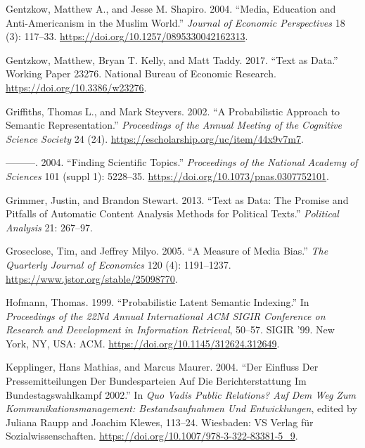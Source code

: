 \documentclass[
]{article}
\begin{document}
\leavevmode\hypertarget{ref-gentzkow_media_2004}{}%
Gentzkow, Matthew A., and Jesse M. Shapiro. 2004. ``Media, Education and
Anti-Americanism in the Muslim World.'' \emph{Journal of Economic
Perspectives} 18 (3): 117--33.
\url{https://doi.org/10.1257/0895330042162313}.

\leavevmode\hypertarget{ref-gentzkow_text_2017}{}%
Gentzkow, Matthew, Bryan T. Kelly, and Matt Taddy. 2017. ``Text as
Data.'' Working Paper 23276. National Bureau of Economic Research.
\url{https://doi.org/10.3386/w23276}.

\leavevmode\hypertarget{ref-griffiths_probabilistic_2002}{}%
Griffiths, Thomas L., and Mark Steyvers. 2002. ``A Probabilistic
Approach to Semantic Representation.'' \emph{Proceedings of the Annual
Meeting of the Cognitive Science Society} 24 (24).
\url{https://escholarship.org/uc/item/44x9v7m7}.

\leavevmode\hypertarget{ref-griffiths_finding_2004}{}%
---------. 2004. ``Finding Scientific Topics.'' \emph{Proceedings of the
National Academy of Sciences} 101 (suppl 1): 5228--35.
\url{https://doi.org/10.1073/pnas.0307752101}.

\leavevmode\hypertarget{ref-grimmer_text_2013}{}%
Grimmer, Justin, and Brandon Stewart. 2013. ``Text as Data: The Promise
and Pitfalls of Automatic Content Analysis Methods for Political
Texts.'' \emph{Political Analysis} 21: 267--97.

\leavevmode\hypertarget{ref-groseclose_measure_2005}{}%
Groseclose, Tim, and Jeffrey Milyo. 2005. ``A Measure of Media Bias.''
\emph{The Quarterly Journal of Economics} 120 (4): 1191--1237.
\url{https://www.jstor.org/stable/25098770}.

\leavevmode\hypertarget{ref-hofmann_probabilistic_1999}{}%
Hofmann, Thomas. 1999. ``Probabilistic Latent Semantic Indexing.'' In
\emph{Proceedings of the 22Nd Annual International ACM SIGIR Conference
on Research and Development in Information Retrieval}, 50--57. SIGIR
'99. New York, NY, USA: ACM.
\url{https://doi.org/10.1145/312624.312649}.

\leavevmode\hypertarget{ref-kepplinger_einfluss_2004}{}%
Kepplinger, Hans Mathias, and Marcus Maurer. 2004. ``Der Einfluss Der
Pressemitteilungen Der Bundesparteien Auf Die Berichterstattung Im
Bundestagswahlkampf 2002.'' In \emph{Quo Vadis Public Relations? Auf Dem
Weg Zum Kommunikationsmanagement: Bestandsaufnahmen Und Entwicklungen},
edited by Juliana Raupp and Joachim Klewes, 113--24. Wiesbaden: VS
Verlag für Sozialwissenschaften.
\url{https://doi.org/10.1007/978-3-322-83381-5_9}.
\end{document}

